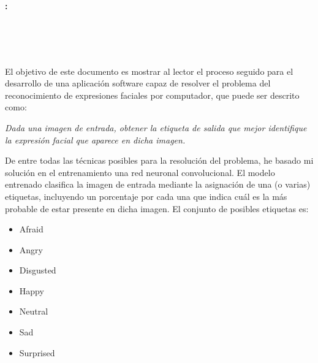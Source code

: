 \chapter*{}






\cleardoublepage
\thispagestyle{empty}

\begin{center}
{\large\bfseries \myTitle: \mySubtitle}\\
\end{center}
\begin{center}
\myName\\
\end{center}

\\

\vspace{0.7cm}
\\

El objetivo de este documento es mostrar al lector el proceso seguido para el desarrollo de una aplicación software capaz de resolver el problema del reconocimiento de expresiones faciales por computador, que puede ser descrito como:\\
\begin{center}
	
	\textit{Dada una imagen de entrada, obtener la etiqueta de salida que mejor identifique la expresión facial que aparece en dicha imagen.}\\
	
\end{center}
De entre todas las técnicas posibles para la resolución del problema, he basado mi solución en el entrenamiento una red neuronal convolucional. El modelo entrenado clasifica la imagen de entrada mediante la asignación de una (o varias) etiquetas, incluyendo un porcentaje por cada una que indica cuál es la más probable de estar presente en dicha imagen. El conjunto de posibles etiquetas es:
\begin{multicols}{2}
	\begin{itemize}
      \item Afraid
      \item Angry
      \item Disgusted
      \item Happy
      \item Neutral
      \item Sad
      \item Surprised
	\end{itemize}
\end{multicols}


